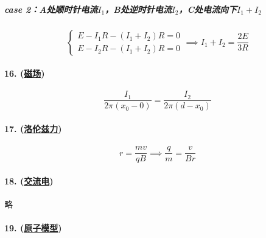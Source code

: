 \subparagraph{case 2：A处顺时针电流$I_1$，B处逆时针电流$I_2$，C处电流向下$I_1+I_2$}
\begin{equation*}
    \begin{cases}
        E-I_1R-(I_1+I_2)R=0\\
        E-I_2R-(I_1+I_2)R=0
    \end{cases}\implies I_1+I_2=\frac{2E}{3R}
\end{equation*}

\paragraph{16. (\hyperref[subsec:磁场]{磁场})}

\begin{equation*}
    \frac{I_1}{2\pi(x_0-0)}=\frac{I_2}{2\pi(d-x_0)}
\end{equation*}

\paragraph{17. (\hyperref[subsec:洛伦兹力]{洛伦兹力})}

\begin{equation*}
    r=\frac{mv}{qB}\implies\frac{q}{m}=\frac{v}{Br}
\end{equation*}

\paragraph{18. (\hyperref[subsec:交流电]{交流电})} 略

\paragraph{19. (\hyperref[sec:原子模型]{原子模型})}

\begin{center}
\end{center}
